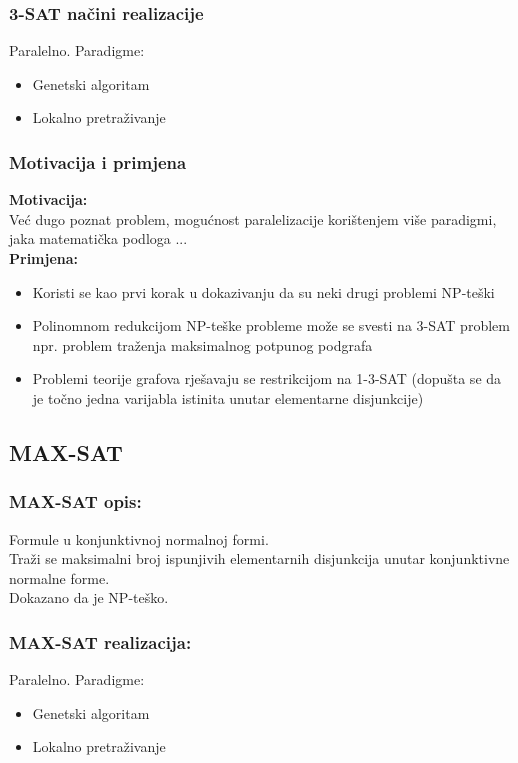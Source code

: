 \documentclass{beamer}
\begin{document}
\begin{frame}
 \frametitle{3-SAT načini realizacije}
 Paralelno.
 \newline
 \newline
 Paradigme:\\
 \begin{itemize}
  \item Genetski algoritam 
  \item Lokalno pretraživanje
 \end{itemize}
\end{frame}

\begin{frame}
 \frametitle{Motivacija i primjena}
 \textbf{Motivacija:}\\
 Već dugo poznat problem, mogućnost paralelizacije korištenjem više paradigmi, jaka matematička podloga ...\\
 \textbf{Primjena:}
 \begin{itemize}
 \item Koristi se kao prvi korak u dokazivanju da su neki drugi problemi NP-teški
 \item Polinomnom redukcijom NP-teške probleme može se svesti na 3-SAT problem npr. problem traženja maksimalnog potpunog podgrafa\\
 \item Problemi teorije grafova rješavaju se restrikcijom na 1-3-SAT (dopušta se da je točno jedna varijabla istinita unutar elementarne disjunkcije)\\
 \end{itemize}
 \end{frame}
\subsection{MAX-SAT}
\begin{frame}
 \frametitle{MAX-SAT opis:}
 Formule u konjunktivnoj normalnoj formi.\\
 Traži se maksimalni broj ispunjivih elementarnih disjunkcija unutar konjunktivne normalne forme.\\
 Dokazano da je NP-teško.
\end{frame}

\begin{frame}
 \frametitle{MAX-SAT realizacija:}
 Paralelno.
 \newline
 \newline
 Paradigme:
 \begin{itemize}
  \item Genetski algoritam
  \item Lokalno pretraživanje
 \end{itemize}
\end{frame}
 
\end{document}
